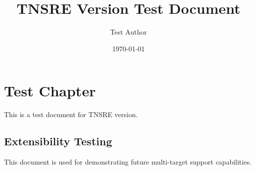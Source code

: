 \documentclass[12pt,a4paper]{ltjsbook}
\title{TNSRE Version Test Document}
\author{Test Author}
\date{\today}
\begin{document}
\maketitle

\chapter{Test Chapter}

This is a test document for TNSRE version.

\section{Extensibility Testing}

This document is used for demonstrating future multi-target support capabilities.





\end{document}
